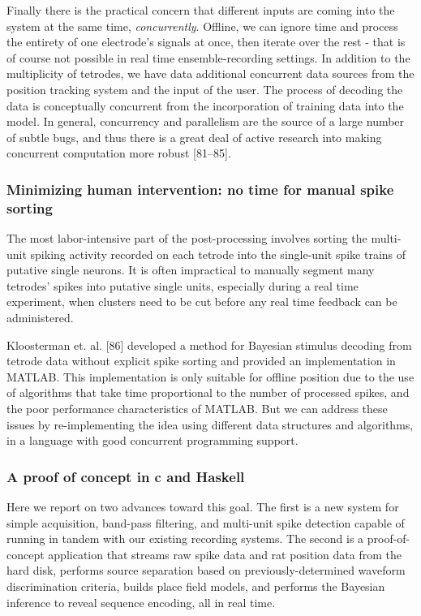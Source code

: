 \documentclass[]{article}
\begin{document}
Finally there is the practical concern that different inputs are coming
into the system at the same time, \emph{concurrently}. Offline, we can
ignore time and process the entirety of one electrode's signals at once,
then iterate over the rest - that is of course not possible in real time
ensemble-recording settings. In addition to the multiplicity of
tetrodes, we have data additional concurrent data sources from the
position tracking system and the input of the user. The process of
decoding the data is conceptually concurrent from the incorporation of
training data into the model. In general, concurrency and parallelism
are the source of a large number of subtle bugs, and thus there is a
great deal of active research into making concurrent computation more
robust {[}81--85{]}.

\subsubsection{Minimizing human intervention: no time for manual spike
sorting}

The most labor-intensive part of the post-processing involves sorting
the multi-unit spiking activity recorded on each tetrode into the
single-unit spike trains of putative single neurons. It is often
impractical to manually segment many tetrodes' spikes into putative
single units, especially during a real time experiment, when clusters
need to be cut before any real time feedback can be administered.

Kloosterman et. al. {[}86{]} developed a method for Bayesian stimulus
decoding from tetrode data without explicit spike sorting and provided
an implementation in MATLAB. This implementation is only suitable for
offline position due to the use of algorithms that take time
proportional to the number of processed spikes, and the poor performance
characteristics of MATLAB. But we can address these issues by
re-implementing the idea using different data structures and algorithms,
in a language with good concurrent programming support.

\subsubsection{A proof of concept in c and Haskell}

Here we report on two advances toward this goal. The first is a new
system for simple acquisition, band-pass filtering, and multi-unit spike
detection capable of running in tandem with our existing recording
systems. The second is a proof-of-concept application that streams raw
spike data and rat position data from the hard disk, performs source
separation based on previously-determined waveform discrimination
criteria, builds place field models, and performs the Bayesian inference
to reveal sequence encoding, all in real time.
\end{document}
